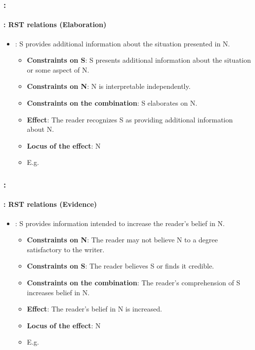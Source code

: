 \documentclass[xcolor=table]{beamer}
\begin{document}
\begin{frame}
	\frametitle{\insertshortsubtitle: \insertsection}
	\framesubtitle{\insertsubsection: RST relations (Elaboration)}
	
	\begin{itemize}
		\item {}: S provides additional information about the situation presented in N.
		\begin{itemize}
			\item \textbf{Constraints on S}: S presents additional information about the situation or some aspect of N.
			\item \textbf{Constraints on N}: N is interpretable independently.
			\item \textbf{Constraints on the combination}: S elaborates on N.
			\item \textbf{Effect}: The reader recognizes S as providing additional information about N.
			\item \textbf{Locus of the effect}: N
			\item E.g. 
		\end{itemize}
	\end{itemize}
	
\end{frame}

\begin{frame}
	\frametitle{\insertshortsubtitle: \insertsection}
	\framesubtitle{\insertsubsection: RST relations (Evidence)}
	
	\begin{itemize}
		\item {}: S provides information intended to increase the reader's belief in N.
		\begin{itemize}
			\item \textbf{Constraints on N}: The reader may not believe N to a degree satisfactory to the writer.
			\item \textbf{Constraints on S}: The reader believes S or finds it credible.
			\item \textbf{Constraints on the combination}: The reader's comprehension of S increases belief in N.
			\item \textbf{Effect}: The reader's belief in N is increased.
			\item \textbf{Locus of the effect}: N
			\item E.g. 
		\end{itemize}
	\end{itemize}
	
\end{frame}
\end{document}
